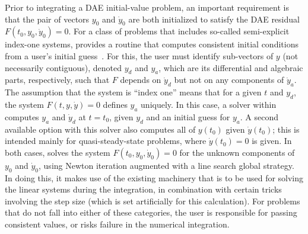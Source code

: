 Prior to integrating a DAE initial-value problem, an important requirement 
is that the pair of vectors $y_0$ and $\dot y_0$ are both initialized to
satisfy the DAE residual $F(t_0,y_0, \dot y_0) = 0$.
For a class of problems that includes so-called
semi-explicit index-one systems, {\idas} provides a routine that computes
consistent initial conditions from a user's initial guess~\cite{BHP:98}.  
For this, the user must identify sub-vectors of $y$
(not necessarily contiguous), denoted $y_d$ and $y_a$, which are its
differential and algebraic parts, respectively, such that $F$ depends
on $\dot y_d$ but not on any components of $\dot y_a$.  The assumption that
the system is ``index one'' means that for a given $t$ and $y_d$, the
system $F(t, y, \dot y) = 0$ defines $y_a$ uniquely.  In this case, a solver
within {\idas} computes $y_a$ and $\dot y_d$ at $t = t_0$, given $y_d$ and an
initial guess for $y_a$.  A second available option with this solver
also computes all of $y(t_0)$ given $\dot y(t_0)$; this is intended mainly
for quasi-steady-state problems, where $\dot y(t_0) = 0$ is given.
In both cases, {\idas} solves the system $F(t_0, y_0, \dot y_0) = 0$ for the
unknown components of $y_0$ and $\dot y_0$, using Newton iteration
augmented with a line search global strategy.  In doing this, it makes
use of the existing machinery that is to be used for solving the
linear systems during the integration, in combination with certain
tricks involving the step size (which is set artificially for this
calculation).
For problems that do not fall into either of these categories, the
user is responsible for passing consistent values, or risks failure in
the numerical integration.

